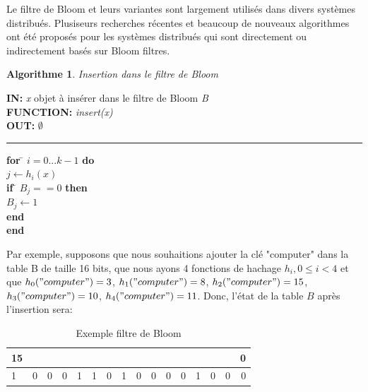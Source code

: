 	Le filtre de Bloom et leurs variantes sont largement utilisés dans divers systèmes distribués. Plusiseurs recherches récentes et beaucoup de nouveaux algorithmes ont été proposés pour les systèmes distribués qui sont directement ou indirectement basés sur Bloom filtres\cite{theory-and-practice-of-bloom-filters-for-distributed-systems}.
	
\newtheorem{algorithme}{Algorithme}
\begin{algorithme}
	Insertion dans le filtre de Bloom
\end{algorithme}

\begin{flushleft}
	\begin{framed}
		\textbf{IN:} \textit{x} objet à insérer dans le filtre de Bloom \textit{B}\\
		\textbf{FUNCTION:} \textit{insert(x)}\\
		\textbf{OUT:} $\emptyset$
		\noindent\rule{\linewidth}{0.5pt}

		\begin{tabbing}
			\textbf{for} \= $i = 0 ... k - 1$ \textbf{do}\\
					\> $j \leftarrow h_i(x)$\\
					\> \textbf{if} \= $B_j == 0$ \textbf{then}\\
					\> \> $B_j \leftarrow 1$\\
					\> \textbf{end}\\
			\textbf{end}
	    	\end{tabbing}		
	\end{framed}
\end{flushleft}
	
	Par exemple, supposons que nous souhaitions ajouter la clé "computer" dans la table B de taille 16 bits, que nous ayons 4 fonctions de hachage $ h_i, 0 \leq i < 4 $ et que $ h_0("computer") = 3$, $ h_1("computer") = 8$, $ h_2("computer") = 15$, $h_3("computer") = 10$, $h_4("computer") = 11 $. Donc, l'état de la table $ B $ après l'insertion sera:
	\begin{table}[!h]
		\centering		
		\begin{tabular}{|l|*{14}{c|}r|}
		\multicolumn{1}{c}{{\scriptsize 15}} &\multicolumn{1}{c}{}&\multicolumn{1}{c}{}&\multicolumn{1}{c}{}&\multicolumn{1}{c}{}&\multicolumn{1}{c}{}&\multicolumn{1}{c}{}&\multicolumn{1}{c}{}&\multicolumn{1}{c}{}&\multicolumn{1}{c}{}&\multicolumn{1}{c}{}&\multicolumn{1}{c}{}&\multicolumn{1}{c}{}&\multicolumn{1}{c}{}&\multicolumn{1}{c}{}&\multicolumn{1}{c}{{\scriptsize 0}}\\
		\hline
			1 & 0 & 0 & 0 & 1 & 1 & 0 & 1 & 0 & 0 & 0 & 0 & 1 & 0 & 0 & 0 \\
		\hline
		\end{tabular}
		\caption{Exemple filtre de Bloom}
		\label{filtredeBloom/exemple}
	\end{table}
	
